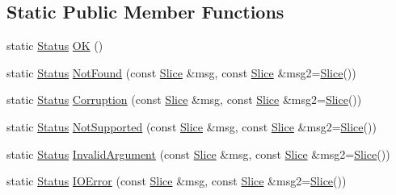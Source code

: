 \subsection*{Static Public Member Functions}
\begin{DoxyCompactItemize}
\item 
static \hyperlink{classleveldb_1_1_status}{Status} \hyperlink{classleveldb_1_1_status_a8e3720d233281c874a53c17e081f51b3}{O\-K} ()
\item 
static \hyperlink{classleveldb_1_1_status}{Status} \hyperlink{classleveldb_1_1_status_a9e5beb5b2e758f041e0c012426e7b1b8}{Not\-Found} (const \hyperlink{classleveldb_1_1_slice}{Slice} \&msg, const \hyperlink{classleveldb_1_1_slice}{Slice} \&msg2=\hyperlink{classleveldb_1_1_slice}{Slice}())
\item 
static \hyperlink{classleveldb_1_1_status}{Status} \hyperlink{classleveldb_1_1_status_a755b1ee5b0029cf9ea1128f1cdff5855}{Corruption} (const \hyperlink{classleveldb_1_1_slice}{Slice} \&msg, const \hyperlink{classleveldb_1_1_slice}{Slice} \&msg2=\hyperlink{classleveldb_1_1_slice}{Slice}())
\item 
static \hyperlink{classleveldb_1_1_status}{Status} \hyperlink{classleveldb_1_1_status_a66c6b7171cedb55651e34e5df9a14705}{Not\-Supported} (const \hyperlink{classleveldb_1_1_slice}{Slice} \&msg, const \hyperlink{classleveldb_1_1_slice}{Slice} \&msg2=\hyperlink{classleveldb_1_1_slice}{Slice}())
\item 
static \hyperlink{classleveldb_1_1_status}{Status} \hyperlink{classleveldb_1_1_status_aefef9f88d0a6ca6d34bd9dec1670309e}{Invalid\-Argument} (const \hyperlink{classleveldb_1_1_slice}{Slice} \&msg, const \hyperlink{classleveldb_1_1_slice}{Slice} \&msg2=\hyperlink{classleveldb_1_1_slice}{Slice}())
\item 
static \hyperlink{classleveldb_1_1_status}{Status} \hyperlink{classleveldb_1_1_status_ada6143081d41803808f77287153f96b7}{I\-O\-Error} (const \hyperlink{classleveldb_1_1_slice}{Slice} \&msg, const \hyperlink{classleveldb_1_1_slice}{Slice} \&msg2=\hyperlink{classleveldb_1_1_slice}{Slice}())
\end{DoxyCompactItemize}
